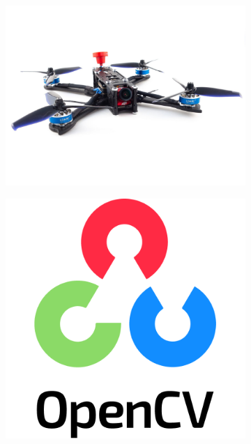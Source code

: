 \documentclass[a4paper,12pt]{article} %
\begin{document}
\begin{figure}[h]
    \centering
    \begin{subfigure}{0.4\textwidth}
        \includegraphics[width=\linewidth]{../img/drone.jpg}
    \end{subfigure}
    \hfill
    \begin{subfigure}{0.2\textwidth}
        \includegraphics[width=\linewidth]{../img/opencv.png}
    \end{subfigure}

\end{figure}
\end{document}
